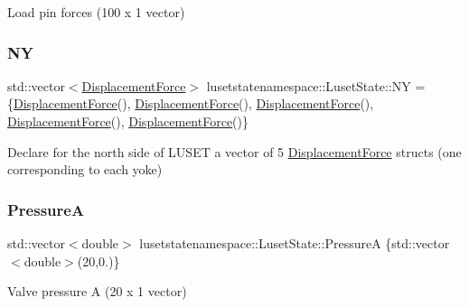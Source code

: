 Load pin forces (100 x 1 vector) 

\mbox{\label{classlusetstatenamespace_1_1LusetState_a457bc98481c1c2e653dc63df35586836}} 
\subsubsection{\texorpdfstring{NY}{NY}}
{\footnotesize\ttfamily std\+::vector$<$\hyperlink{structlusetstatenamespace_1_1LusetState_1_1DisplacementForce}{Displacement\+Force}$>$ lusetstatenamespace\+::\+Luset\+State\+::\+NY = \{\hyperlink{structlusetstatenamespace_1_1LusetState_1_1DisplacementForce}{Displacement\+Force}(), \hyperlink{structlusetstatenamespace_1_1LusetState_1_1DisplacementForce}{Displacement\+Force}(), \hyperlink{structlusetstatenamespace_1_1LusetState_1_1DisplacementForce}{Displacement\+Force}(), \hyperlink{structlusetstatenamespace_1_1LusetState_1_1DisplacementForce}{Displacement\+Force}(), \hyperlink{structlusetstatenamespace_1_1LusetState_1_1DisplacementForce}{Displacement\+Force}()\}}



Declare for the north side of L\+U\+S\+ET a vector of 5 \hyperlink{structlusetstatenamespace_1_1LusetState_1_1DisplacementForce}{Displacement\+Force} structs (one corresponding to each yoke) 

\mbox{\label{classlusetstatenamespace_1_1LusetState_a0abcd02e8f1c180bc12c1ede94374c74}} 
\subsubsection{\texorpdfstring{PressureA}{PressureA}}
{\footnotesize\ttfamily std\+::vector$<$double$>$ lusetstatenamespace\+::\+Luset\+State\+::\+PressureA \{std\+::vector$<$double$>$(20,0.)\}}



Valve pressure A (20 x 1 vector) 

\mbox{\label{classlusetstatenamespace_1_1LusetState_a2801e7d85681d309b947e5285674fcb7}} 
